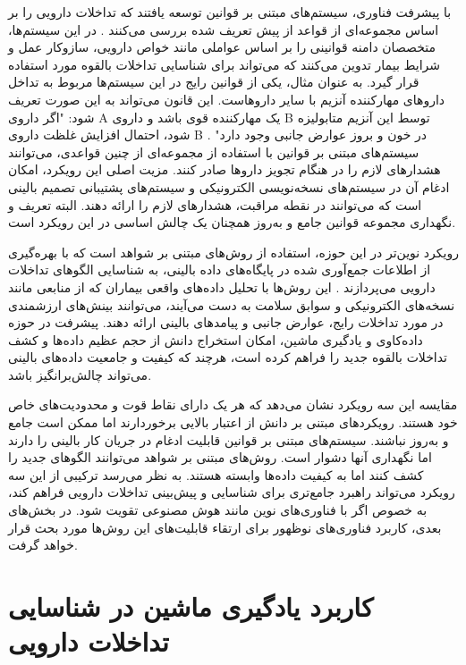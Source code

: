 با پیشرفت فناوری، سیستم‌های مبتنی بر قوانین توسعه یافتند که تداخلات دارویی را بر اساس مجموعه‌ای از قواعد از پیش تعریف شده بررسی می‌کنند \cite{ref_wang2017}. در این سیستم‌ها، متخصصان دامنه قوانینی را بر اساس عواملی مانند خواص دارویی، سازوکار عمل و شرایط بیمار تدوین می‌کنند که می‌تواند برای شناسایی تداخلات بالقوه مورد استفاده قرار گیرد. به عنوان مثال، یکی از قوانین رایج در این سیستم‌ها مربوط به تداخل داروهای مهارکننده آنزیم  با سایر داروهاست. این قانون می‌تواند به این صورت تعریف شود: "اگر داروی A یک مهارکننده قوی  باشد و داروی B توسط این آنزیم متابولیزه شود، احتمال افزایش غلظت داروی B در خون و بروز عوارض جانبی وجود دارد" \cite{ref_cascorbi2012}. سیستم‌های مبتنی بر قوانین با استفاده از مجموعه‌ای از چنین قواعدی، می‌توانند هشدارهای لازم را در هنگام تجویز داروها صادر کنند. مزیت اصلی این رویکرد، امکان ادغام آن در سیستم‌های نسخه‌نویسی الکترونیکی و سیستم‌های پشتیبانی تصمیم بالینی است که می‌توانند در نقطه مراقبت، هشدارهای لازم را ارائه دهند. البته تعریف و نگهداری مجموعه قوانین جامع و به‌روز همچنان یک چالش اساسی در این رویکرد است.

رویکرد نوین‌تر در این حوزه، استفاده از روش‌های مبتنی بر شواهد است که با بهره‌گیری از اطلاعات جمع‌آوری شده در پایگاه‌های داده بالینی، به شناسایی الگوهای تداخلات دارویی می‌پردازند \cite{ref_he2023}. این روش‌ها با تحلیل داده‌های واقعی بیماران که از منابعی مانند نسخه‌های الکترونیکی و سوابق سلامت به دست می‌آیند، می‌توانند بینش‌های ارزشمندی در مورد تداخلات رایج، عوارض جانبی و پیامدهای بالینی ارائه دهند. پیشرفت در حوزه داده‌کاوی و یادگیری ماشین، امکان استخراج دانش از حجم عظیم داده‌ها و کشف تداخلات بالقوه جدید را فراهم کرده است، هرچند که کیفیت و جامعیت داده‌های بالینی می‌تواند چالش‌برانگیز باشد.

مقایسه این سه رویکرد نشان می‌دهد که هر یک دارای نقاط قوت و محدودیت‌های خاص خود هستند. رویکردهای مبتنی بر دانش از اعتبار بالایی برخوردارند اما ممکن است جامع و به‌روز نباشند. سیستم‌های مبتنی بر قوانین قابلیت ادغام در جریان کار بالینی را دارند اما نگهداری آنها دشوار است. روش‌های مبتنی بر شواهد می‌توانند الگوهای جدید را کشف کنند اما به کیفیت داده‌ها وابسته هستند. به نظر می‌رسد ترکیبی از این سه رویکرد می‌تواند راهبرد جامع‌تری برای شناسایی و پیش‌بینی تداخلات دارویی فراهم کند، به خصوص اگر با فناوری‌های نوین مانند هوش مصنوعی تقویت شود. در بخش‌های بعدی، کاربرد فناوری‌های نوظهور برای ارتقاء قابلیت‌های این روش‌ها مورد بحث قرار خواهد گرفت.

\section{کاربرد یادگیری ماشین در شناسایی تداخلات دارویی}

